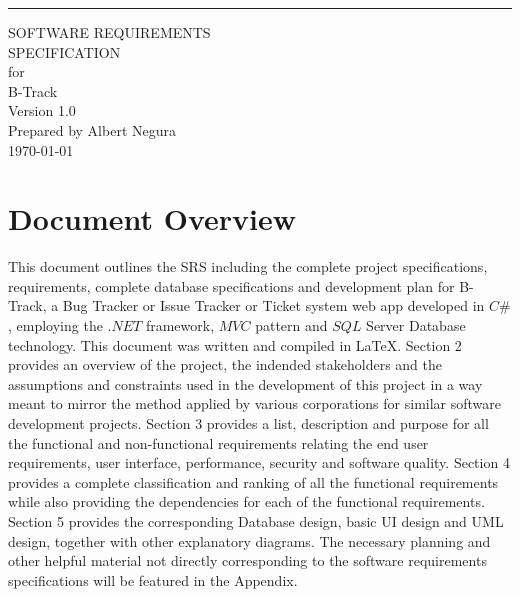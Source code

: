 \documentclass[openany, oneside,11pt]{book}
\date{}
\def\myversion{1.0 }
\begin{document}
\thispagestyle{empty}
\begin{flushright}
    \rule{16cm}{5pt}\vskip1cm
    \begin{bfseries}
        \Huge{SOFTWARE REQUIREMENTS\\ SPECIFICATION}\\
        \vspace{1.5cm}
        for\\
        \vspace{1.5cm}
        B-Track\\
        \vspace{1.5cm}
        \LARGE{Version \myversion}\\
        \vspace{1.5cm}
        Prepared by Albert Negura\\
        \vspace{1.5cm}
        \today\\
    \end{bfseries}
\end{flushright}
\clearpage
\tableofcontents
\setcounter{page}{0}
\chapter{Document Overview}
\thispagestyle{fancy}
This document outlines the SRS including the complete project specifications, requirements, complete database specifications and development plan for B-Track, a Bug Tracker or Issue Tracker or Ticket system web app developed in $C\#$, employing the $.NET$ framework, $MVC$ pattern and $SQL$ Server Database technology. This document was written and compiled in LaTeX.
\newline
\newline
Section 2 provides an overview of the project, the indended stakeholders and the assumptions and constraints used in the development of this project in a way meant to mirror the method applied by various corporations for similar software development projects.
\newline
\newline
Section 3 provides a list, description and purpose for all the functional and non-functional requirements relating the end user requirements, user interface, performance, security and software quality.
\newline
\newline
Section 4 provides a complete classification and ranking of all the functional requirements while also providing the dependencies for each of the functional requirements.
\newline
\newline
Section 5 provides the corresponding Database design, basic UI design and UML design, together with other explanatory diagrams.
\newline
\newline
The necessary planning and other helpful material not directly corresponding to the software requirements specifications will be featured in the Appendix.
\newline
\newline
\end{document}
